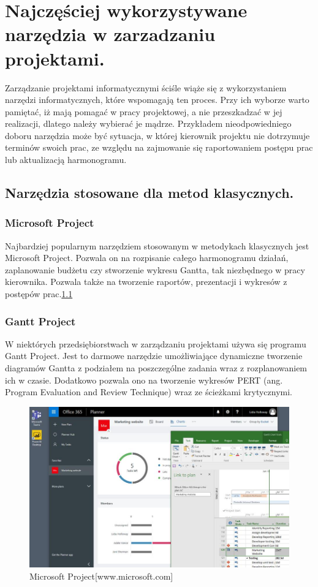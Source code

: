 
\chapter{Najczęściej wykorzystywane narzędzia w zarzadzaniu projektami.}

Zarządzanie projektami informatycznymi ściśle wiąże się z wykorzystaniem narzędzi informatycznych, które wspomagają ten proces. Przy ich wyborze warto pamiętać, iż mają pomagać w pracy projektowej, a nie przeszkadzać w jej realizacji, dlatego należy wybierać je mądrze. Przykładem nieodpowiedniego doboru narzędzia może być sytuacja, w której kierownik projektu nie dotrzymuje terminów swoich prac, ze względu na zajmowanie się raportowaniem postępu prac lub aktualizacją harmonogramu.\cite{Kopczewski_2015}

\section{Narzędzia stosowane dla metod klasycznych.}

\subsection{Microsoft Project}

Najbardziej popularnym narzędziem stosowanym w metodykach klasycznych jest Microsoft Project. Pozwala on na rozpisanie całego harmonogramu działań, zaplanowanie budżetu czy stworzenie wykresu Gantta, tak niezbędnego w pracy kierownika. Pozwala także na tworzenie raportów, prezentacji i wykresów z postępów prac.\ref{rys:project}

\subsection{Gantt Project}

W niektórych przedsiębiorstwach w zarządzaniu projektami używa się programu Gantt Project. Jest to darmowe narzędzie umożliwiające dynamiczne tworzenie diagramów Gantta z podziałem na poszczególne zadania wraz z rozplanowaniem ich w czasie. Dodatkowo pozwala ono na tworzenie wykresów PERT (ang. Program Evaluation and Review Technique) wraz ze ścieżkami krytycznymi.\cite{Trendy_Zarzadzanie}

\begin{figure}
	\centering\includegraphics[width=.6\textwidth]{img/Microsoft_Project}
	\caption{Microsoft Project[www.microsoft.com]} \label{rys:project}%
\end{figure}

